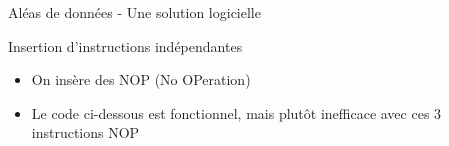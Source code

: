 %
\begin{Frame}{Aléas de données - Une solution logicielle}

  \begin{block}{Insertion d'instructions indépendantes}
       \begin{center}
 	\begin{itemize}
          \item On insère des NOP (No OPeration)
          \item Le code ci-dessous est fonctionnel, mais plutôt inefficace avec ces 3 instructions NOP 
        \end{itemize}
       \end{center}
      \end{block}   

\vspace{-0.1cm}
        \begin{center}
        \end{center}
 


\end{Frame}


